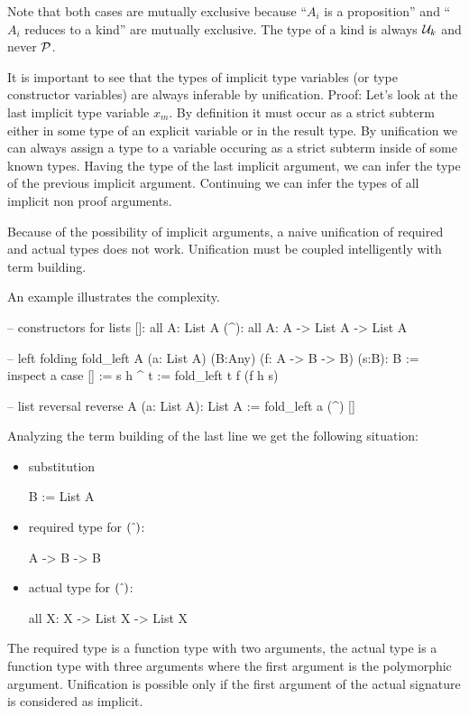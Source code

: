 Note that both cases are mutually exclusive because ``$A_i$ is a proposition''
and ``$A_i$ reduces to a kind'' are mutually exclusive. The type of a kind is
always ${\cal{U}}_k$ and never ${\cal{P}}$.

It is important to see that the types of implicit type variables (or type
constructor variables) are always inferable by unification. Proof: Let's look
at the last implicit type variable $x_m$. By definition it must occur as a
strict subterm either in some type of an explicit variable or in the result
type. By unification we can always assign a type to a variable occuring as a
strict subterm inside of some known types. Having the type of the last
implicit argument, we can infer the type of the previous implicit
argument. Continuing we can infer the types of all implicit non proof
arguments.


Because of the possibility of implicit arguments, a naive unification of
required and actual types does not work. Unification must be coupled
intelligently with term building.

An example illustrates the complexity.

\begin{alba}
  -- constructors for lists
  []:  all A: List A
  (^): all A: A -> List A -> List A

  -- left folding
  fold_left A (a: List A) (B:Any) (f: A -> B -> B) (s:B): B :=
    inspect a case
      [] :=
        s
      h ^ t :=
        fold_left t f (f h s)

   -- list reversal
   reverse A (a: List A): List A :=
     fold_left a (^) []
\end{alba}

Analyzing the term building of the last line we get the following situation:

\begin{itemize}
\item substitution
  \begin{alba}
    B := List A
  \end{alba}
\item required type for $(\mathrel{\hat{\ }})$:
  \begin{alba}
    A -> B -> B
  \end{alba}
\item actual type for $(\mathrel{\hat{\ }})$:
  \begin{alba}
    all X: X -> List X -> List X
  \end{alba}
\end{itemize}
The required type is a function type with two arguments, the actual type is a
function type with three arguments where the first argument is the polymorphic
argument. Unification is possible only if the first argument of the actual
signature is considered as implicit.


